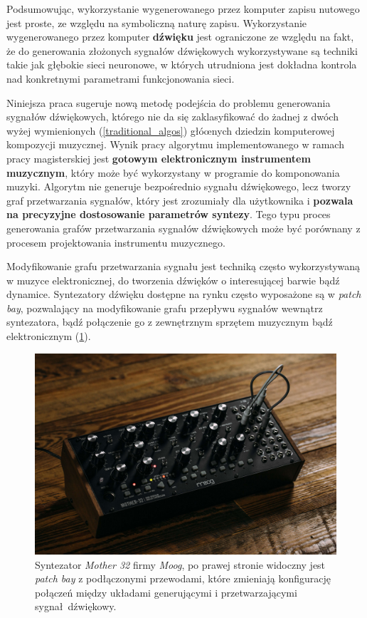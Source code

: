 Podsumowując, wykorzystanie wygenerowanego przez komputer zapisu nutowego jest proste, ze względu na symboliczną naturę zapisu.
Wykorzystanie wygenerowanego przez komputer \textbf{dźwięku} jest ograniczone ze względu na fakt, że do generowania złożonych sygnałów dźwiękowych wykorzystywane są techniki takie jak głębokie sieci neuronowe, w których utrudniona jest dokładna kontrola nad konkretnymi parametrami funkcjonowania sieci.

Niniejsza praca sugeruje nową metodę podejścia do problemu generowania sygnałów dźwiękowych,
którego nie da się zaklasyfikować do żadnej z dwóch wyżej wymienionych (\ref{traditional_algos}) głóœnych dziedzin komputerowej kompozycji muzycznej.
Wynik pracy algorytmu implementowanego w ramach pracy magisterskiej jest \textbf{gotowym elektronicznym
instrumentem muzycznym}, który może być wykorzystany w programie do komponowania muzyki. Algorytm nie generuje bezpośrednio sygnału dźwiękowego, lecz tworzy graf przetwarzania sygnałów, który jest zrozumiały dla użytkownika i \textbf{pozwala na precyzyjne dostosowanie parametrów syntezy}.
Tego typu proces generowania grafów przetwarzania sygnałów dźwiękowych może być porównany z procesem projektowania instrumentu muzycznego.

Modyfikowanie grafu przetwarzania sygnału jest techniką często wykorzystywaną w muzyce
elektronicznej, do tworzenia dźwięków o interesującej barwie bądź dynamice. Syntezatory dźwięku
dostępne na rynku często wyposażone są w \textit{patch bay}, pozwalający na modyfikowanie
grafu przepływu sygnałów wewnątrz syntezatora, bądź połączenie go z zewnętrznym sprzętem muzycznym
bądź elektronicznym (\ref{fig:mother32}).

\begin{figure}[H]
    \centering
    \includegraphics[width=0.7\linewidth]{rys01/mother32.jpg}
    \caption{Syntezator \textit{Mother 32} firmy \textit{Moog}, po prawej stronie widoczny
    jest \textit{patch bay} z podłączonymi przewodami, które zmieniają konfigurację
    połączeń między układami generującymi i przetwarzającymi sygnał dźwiękowy.}
    \label{fig:mother32}
\end{figure}


